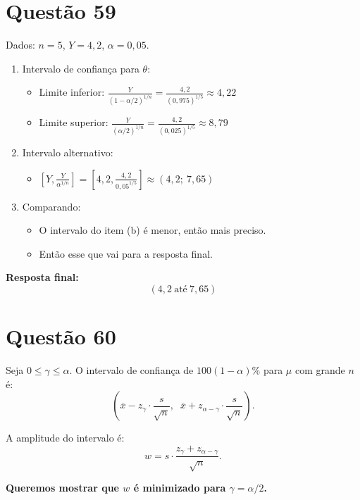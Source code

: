 \documentclass[12pt]{article}
\newcommand{\quest}[1]{\section*{Questão #1}} %
\begin{document}
\quest{59}

Dados: $n = 5$, $Y = 4{,}2$, $\alpha = 0{,}05$.

\begin{enumerate}
    \item Intervalo de confiança para $\theta$:
    \begin{itemize}
        \item Limite inferior: $\displaystyle \frac{Y}{(1 - \alpha/2)^{1/n}} = \frac{4{,}2}{(0{,}975)^{1/5}} \approx 4{,}22$
        \item Limite superior: $\displaystyle \frac{Y}{(\alpha/2)^{1/n}} = \frac{4{,}2}{(0{,}025)^{1/5}} \approx 8{,}79$
    \end{itemize}

    \item Intervalo alternativo:
    \begin{itemize}
        \item $\left[ Y, \frac{Y}{\alpha^{1/n}} \right] = \left[ 4{,}2, \frac{4{,}2}{0{,}05^{1/5}} \right] \approx (4{,}2;\ 7{,}65)$
    \end{itemize}

    \item Comparando:
    \begin{itemize}
        \item O intervalo do item (b) é menor, então mais preciso.
        \item Então esse que vai para a resposta final.
    \end{itemize}
\end{enumerate}

\textbf{Resposta final:}
\[
\boxed{(4{,}2\ \text{até}\ 7{,}65)}
\]

\quest{60}

Seja \(0 \leq \gamma \leq \alpha\). O intervalo de confiança de \(100(1-\alpha)\%\) para \(\mu\) com grande \(n\) é:
\[
\left(\overline{x} - z_{\gamma} \cdot \frac{s}{\sqrt{n}}, \;\; \overline{x} + z_{\alpha - \gamma} \cdot \frac{s}{\sqrt{n}}\right).
\]

A amplitude do intervalo é:
\[
w = s \cdot \frac{z_{\gamma} + z_{\alpha - \gamma}}{\sqrt{n}}.
\]

\textbf{Queremos mostrar que \(w\) é minimizado para \(\gamma = \alpha/2\).}
\end{document}
